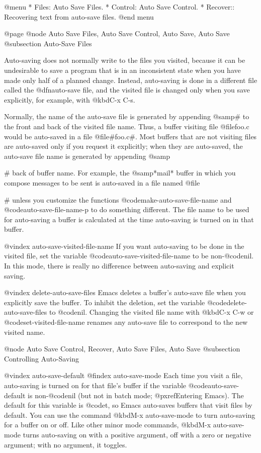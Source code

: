 {{{{{{{{{{{{{{{{{@menu
* Files: Auto Save Files.
* Control: Auto Save Control.
* Recover::		Recovering text from auto-save files.
@end menu

@page
@node Auto Save Files, Auto Save Control, Auto Save, Auto Save
@subsection Auto-Save Files

  Auto-saving does not normally write to the files you visited, because
it can be undesirable to save a program that is in an inconsistent
state when you have made only half of a planned change.  Instead, auto-saving
is done in a different file called the @dfn{auto-save file}, and the
visited file is changed only when you save explicitly, for example, 
with @kbd{C-x C-s}.

  Normally, the name of the auto-save file is generated by appending
@samp{#} to the front and back of the visited file name.  Thus, a buffer
visiting file @file{foo.c} would be auto-saved in a file @file{#foo.c#}.
Most buffers that are not visiting files are auto-saved only if you
request it explicitly; when they are auto-saved, the auto-save file name
is generated by appending @samp{#%
back of buffer name.  For example, the @samp{*mail*} buffer in which you
compose messages to be sent is auto-saved in a file named
@file{#%
unless you customize the functions @code{make-auto-save-file-name} and
@code{auto-save-file-name-p} to do something different.  The file name
to be used for auto-saving a buffer is calculated at the time auto-saving is
turned on in that buffer.

@vindex auto-save-visited-file-name
  If you want auto-saving to be done in the visited file, set the variable
@code{auto-save-visited-file-name} to be non-@code{nil}.  In this mode,
there is really no difference between auto-saving and explicit saving.

@vindex delete-auto-save-files
  Emacs deletes a buffer's auto-save file when you explicitly save the
buffer.  To inhibit the deletion, set the variable
@code{delete-auto-save-files} to @code{nil}.  Changing the visited file
name with @kbd{C-x C-w} or @code{set-visited-file-name} renames any
auto-save file to correspond to the new visited name.

@node Auto Save Control, Recover, Auto Save Files, Auto Save
@subsection Controlling Auto-Saving

@vindex auto-save-default
@findex auto-save-mode
  Each time you visit a file, auto-saving is turned on for that file's
buffer if the variable @code{auto-save-default} is non-@code{nil} (but
not in batch mode; @pxref{Entering Emacs}).  The default for this
variable is @code{t}, so Emacs auto-saves buffers that visit files by
default.  You can use the command @kbd{M-x auto-save-mode} to turn
auto-saving for a buffer on or off.  Like other minor mode commands,
@kbd{M-x auto-save-mode} turns auto-saving on with a positive argument,
off with a zero or negative argument; with no argument, it toggles.

}}}}}}}}}}}}}}}}}}}
